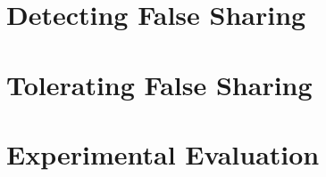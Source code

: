 %

\section{Detecting False Sharing}


\section{Tolerating False Sharing}


\section{Experimental Evaluation}

